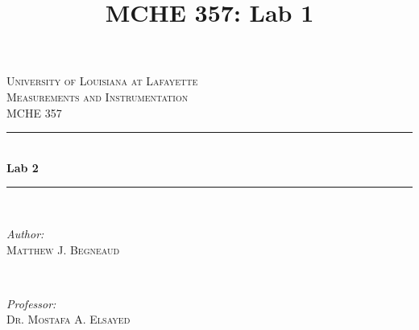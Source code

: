 \documentclass[12pt]{article}
\title{MCHE 357: Lab 1}
\begin{document}




\begin{titlepage}

\newcommand{\HRule}{\rule{\linewidth}{0.5mm}} %

\center %
 

\textsc{\LARGE University of Louisiana at Lafayette}\\[1.5cm] %
\textsc{\Large Measurements and Instrumentation}\\[0.5cm] %
\textsc{\large MCHE 357}\\[0.5cm] %


\HRule \\[0.4cm]
{ \huge \bfseries Lab 2}\\[0.4cm] %
\HRule \\[1.5cm]
 

\begin{minipage}{0.4\textwidth}
\begin{flushleft} \large
\emph{Author:}\\
\textsc{Matthew J. Begneaud} \\%
\end{flushleft}
\end{minipage}
~
\begin{minipage}{0.4\textwidth}
\begin{flushright} \large
\emph{Professor:} \\
\textsc{Dr. Mostafa A. Elsayed} %
\end{flushright}
\end{minipage}\\[1.5cm]


\end{titlepage}
\end{document}
